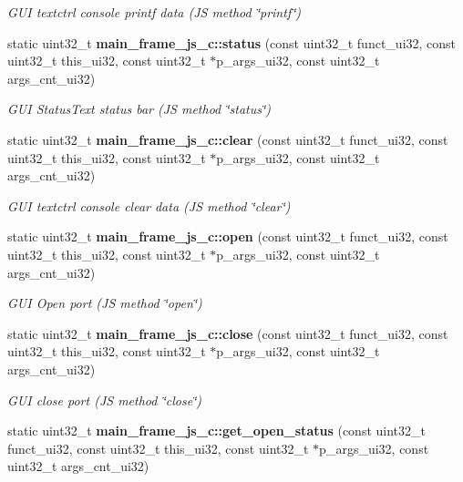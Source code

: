 \begin{DoxyCompactItemize}
\begin{DoxyCompactList}\small\item\em G\+UI textctrl console printf data (JS method \char`\"{}printf\char`\"{}) \end{DoxyCompactList}\item 
static uint32\+\_\+t \textbf{ main\+\_\+frame\+\_\+js\+\_\+c\+::status} (const uint32\+\_\+t funct\+\_\+ui32, const uint32\+\_\+t this\+\_\+ui32, const uint32\+\_\+t $\ast$p\+\_\+args\+\_\+ui32, const uint32\+\_\+t args\+\_\+cnt\+\_\+ui32)
\begin{DoxyCompactList}\small\item\em G\+UI Status\+Text status bar (JS method \char`\"{}status\char`\"{}) \end{DoxyCompactList}\item 
static uint32\+\_\+t \textbf{ main\+\_\+frame\+\_\+js\+\_\+c\+::clear} (const uint32\+\_\+t funct\+\_\+ui32, const uint32\+\_\+t this\+\_\+ui32, const uint32\+\_\+t $\ast$p\+\_\+args\+\_\+ui32, const uint32\+\_\+t args\+\_\+cnt\+\_\+ui32)
\begin{DoxyCompactList}\small\item\em G\+UI textctrl console clear data (JS method \char`\"{}clear\char`\"{}) \end{DoxyCompactList}\item 
static uint32\+\_\+t \textbf{ main\+\_\+frame\+\_\+js\+\_\+c\+::open} (const uint32\+\_\+t funct\+\_\+ui32, const uint32\+\_\+t this\+\_\+ui32, const uint32\+\_\+t $\ast$p\+\_\+args\+\_\+ui32, const uint32\+\_\+t args\+\_\+cnt\+\_\+ui32)
\begin{DoxyCompactList}\small\item\em G\+UI Open port (JS method \char`\"{}open\char`\"{}) \end{DoxyCompactList}\item 
static uint32\+\_\+t \textbf{ main\+\_\+frame\+\_\+js\+\_\+c\+::close} (const uint32\+\_\+t funct\+\_\+ui32, const uint32\+\_\+t this\+\_\+ui32, const uint32\+\_\+t $\ast$p\+\_\+args\+\_\+ui32, const uint32\+\_\+t args\+\_\+cnt\+\_\+ui32)
\begin{DoxyCompactList}\small\item\em G\+UI close port (JS method \char`\"{}close\char`\"{}) \end{DoxyCompactList}\item 
static uint32\+\_\+t \textbf{ main\+\_\+frame\+\_\+js\+\_\+c\+::get\+\_\+open\+\_\+status} (const uint32\+\_\+t funct\+\_\+ui32, const uint32\+\_\+t this\+\_\+ui32, const uint32\+\_\+t $\ast$p\+\_\+args\+\_\+ui32, const uint32\+\_\+t args\+\_\+cnt\+\_\+ui32)

\end{DoxyCompactItemize}

